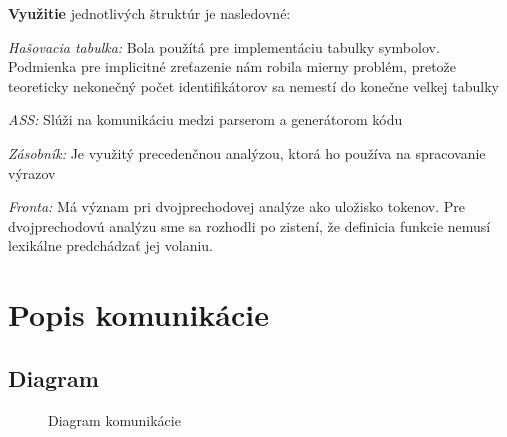 \documentclass[Slovak, a4paper, 12pt]{article}
\begin{document}
	\noindent \textbf{Využitie} jednotlivých štruktúr je nasledovné:\\
	\par\textit{Hašovacia tabulka: } Bola použítá pre implementáciu tabulky symbolov. Podmienka pre implicitné zreťazenie nám 
	robila mierny problém, pretože teoreticky nekonečný počet identifikátorov sa nemestí do konečne velkej tabulky \\
	\par\textit{ASS: } Slúži na komunikáciu medzi parserom a generátorom kódu\\
	\par\textit{Zásobník: } Je využitý precedenčnou analýzou, ktorá ho používa na spracovanie výrazov\\
	\par\textit{Fronta: } Má význam pri dvojprechodovej analýze ako uložisko tokenov. Pre dvojprechodovú analýzu sme sa rozhodli po
	zistení, že definicia funkcie nemusí lexikálne predchádzať jej volaniu.
	
	\newpage
	\section{Popis komunikácie}
	\subsection{Diagram}
	
	\begin{figure}[ht]
		\begin{center}
			\caption{Diagram komunikácie}
		\end{center}
	\end{figure}
\end{document}
